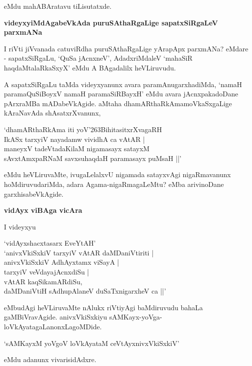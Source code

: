 \noindent
eMdu mahABAratavu tiLisutatxde.

{\bigskip
\noindent
{\large\bf videyxyiMdAgabeVkAda puruSAthaRgaLige sapatxSiRgaLeV parxmANa}}\label{page89}
\medskip

\noindent
I riVti jiVvanada catuviRdha puruSAthaRgaLige yArapApx parxmANa? eMdare - sapatxSiRgaLu, `QuSa jAcnxneV', AdadxriMdaleV `mahaSiR haqdaMtalaRkaSxyX' eMdu A BAgadalilx heVLiruvudu.

A sapatxSiRgaLu taMda videyxyanunx avara paramAnugarxhadiMda, `namaH paramaQuSiBoyxV namaH parama\-SiRBayxH' eMdu avara jAcnxpakadoDane pArxraMBa mADabeVkAgide. aMtaha dhamARthaRkAmamoVkaSxgaLige kAraNavAda shAsatxrXvanunx,

\begin{shloka}
`dhamARthaRkAma iti yoV\char'263BihitasitxrXvagaRH\\
IkASx tarxyiV nayadamw vividhA ca vAtAR |\\
maneyxV tadeVtadaKilaM nigamasayx satayxM\\
sAvxtAmxpaRNaM savxsuhaqdaH paramasayx puMsaH ||'
\end{shloka}

\noindent
eMdu heVLiruvaMte, ivugaLelalxvU nigamada satayxvAgi nigaRmavanunx hoMdiruvudariMda, adara Agama\--nigaRmagaLeMtu? eMba arivinoDane garxhisabeVkAgide.

\newpage

{\bigskip
\noindent
{\large\bf vidAyx viBAga vicAra}}\label{page89}
\medskip

\noindent
I videyxyu 

\begin{shloka}
`vidAyxshacxtasarx EveYtAH'\\
`anivxVkiSxkiV tarxyiV vAtAR daMDaniVtiriti |\\
anivxVkiSxkiV AdhAyxtamx viSayA |\\\label{89}
tarxyiV veVdayajAcnxdiSu |\\
vAtAR kaqSikamARdiSu,\\
daMDaniVtiH sAdhupAlaneV duSaTxnigarxheV ca ||'
\end{shloka}

\noindent
eMbudAgi heVLiruvaMte nAlukx riVtiyAgi baMdiruvudu bahaLa gaMBiVravAgide. anivxVkiSxkiyu sAMKayx\--yoVga-loVkAyatagaLanonxLagoMDide.

\begin{shloka}
`sAMKayxM yoVgoV loVkAyataM ceVtAyxnivxVkiSxkiV'\label{89}
\end{shloka}

\noindent
eMdu adanunx vivarisidAdxre.

